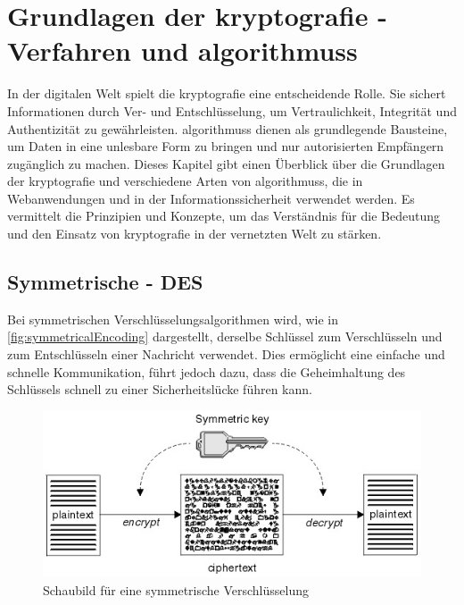 \newpage


\section[Grundlagen der Kryptografie - Kryptografische Verfahren und Algorithmen]{Grundlagen der \gls{kryptografie} -  Verfahren und \glspl{algorithmus}}\label{sec:grundlagen-der-kryptografie}


In der digitalen Welt spielt die \Gls{kryptografie} eine entscheidende Rolle. Sie sichert Informationen durch Ver- und Entschlüsselung, um Vertraulichkeit, Integrität und Authentizität zu gewährleisten.
 \glspl{algorithmus} dienen als grundlegende Bausteine, um Daten in eine unlesbare Form zu bringen und nur autorisierten Empfängern zugänglich zu machen.
Dieses Kapitel gibt einen Überblick über die Grundlagen der \Gls{kryptografie} und verschiedene Arten von \glspl{algorithmus}, die in Webanwendungen und in der Informationssicherheit verwendet werden.
Es vermittelt die Prinzipien und Konzepte, um das Verständnis für die Bedeutung und den Einsatz von \Gls{kryptografie} in der vernetzten Welt zu stärken.


\subsection[Symmetrische Verschlüsselungsalgorithmen]{Symmetrische  - \acf{DES}}\label{subsec:symmetrsiche-algorithmen}
Bei symmetrischen Verschlüsselungsalgorithmen wird, wie in \autoref{fig:symmetricalEncoding}\autocite{Chapter211:online} dargestellt, derselbe Schlüssel zum Verschlüsseln und zum Entschlüsseln einer Nachricht verwendet.
Dies ermöglicht eine einfache und schnelle Kommunikation, führt jedoch dazu, dass die Geheimhaltung des Schlüssels schnell zu einer Sicherheitslücke führen kann.

\begin{figure}[htbp]
    \includegraphics[width=1\linewidth]{abbildungen/symmetricEncoding}
    \centering
    \caption[
        Schaubild für eine symmetrische Verschlüsselung]{Schaubild für eine symmetrische Verschlüsselung\footnotemark}
    \label{fig:symmetricalEncoding}
\end{figure}


